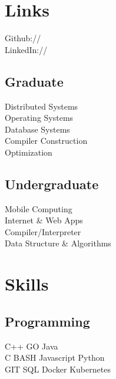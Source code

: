 \documentclass[]{deedy-resume-openfont}
\begin{document}
\begin{minipage}[t]{0.29\textwidth}
\section{Links} 
Github:// \href{https://github.com/sh-ankur/}{} \\
LinkedIn://  \href{https://www.linkedin.com/in/shankur}{} \\
\sectionsep


\subsection{Graduate}
Distributed Systems \\
Operating Systems \\
Database Systems\\
Compiler Construction \\
Optimization \\
\sectionsep

\subsection{Undergraduate}
Mobile Computing \\
Internet \& Web Apps \\
Compiler/Interpreter\\
Data Structure \& Algorithms\\
\sectionsep


\section{Skills}
\subsection{Programming}
C++ \textbullet{}   GO \textbullet{} Java \\
C \textbullet{} BASH \textbullet{} Javascript \textbullet{} Python \\
GIT \textbullet{} SQL \textbullet{} Docker \textbullet{} Kubernetes
\sectionsep



\end{minipage}
\end{document}
